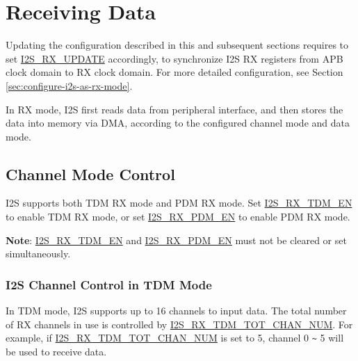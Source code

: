 \documentclass[main\_\_CN.tex]{subfiles}
\begin{document}
\section{Receiving Data}\label{RXCHAN}
\begin{tiplisting}
Updating the configuration described in this and subsequent sections requires to set  \hyperref[fielddesc:I2SRXUPDATE]{I2S\_RX\_UPDATE} accordingly, to synchronize I2S RX registers from APB clock domain to RX clock domain. For more detailed configuration, see Section  \ref{sec:configure-i2s-as-rx-mode}.
\end{tiplisting}
\vspace{-2em}
In RX mode, I2S first reads data from peripheral interface, and then stores the data into memory via DMA, according to the configured channel mode and data mode.

\subsection{Channel Mode Control}
\chipname{} I2S supports both TDM RX mode and PDM RX mode. Set  \hyperref[fielddesc:I2SRXTDMEN]{I2S\_RX\_TDM\_EN} to enable TDM RX mode, or set  \hyperref[fielddesc:I2SRXPDMEN]{I2S\_RX\_PDM\_EN} to enable PDM RX mode.

\textbf{Note}: \hyperref[fielddesc:I2SRXTDMEN]{I2S\_RX\_TDM\_EN} and  \hyperref[fielddesc:I2SRXPDMEN]{I2S\_RX\_PDM\_EN} must not be cleared or set simultaneously.

\subsubsection{I2S Channel Control in TDM Mode}
In TDM mode, I2S supports up to 16 channels to input data. The total number of RX channels in use is controlled by  \hyperref[fielddesc:I2SRXTDMTOTCHANNUM]{I2S\_RX\_TDM\_TOT\_CHAN\_NUM}. For example, if  \hyperref[fielddesc:I2SRXTDMTOTCHANNUM]{I2S\_RX\_TDM\_TOT\_CHAN\_NUM} is set to 5, channel 0 \verb+~+ 5 will be used to receive data.
\end{document}
